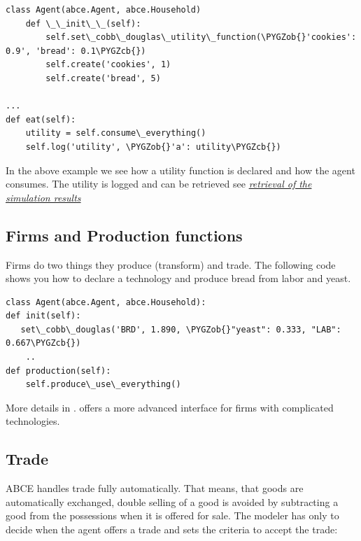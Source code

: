 \documentclass[letterpaper,10pt,english]{sphinxmanual}
\def\PYGZob{\char`\{}
\def\PYGZcb{\char`\}}
\begin{document}
\begin{Verbatim}[commandchars=\\\{\}]
class Agent(abce.Agent, abce.Household)
    def \_\_init\_\_(self):
        self.set\_cobb\_douglas\_utility\_function(\PYGZob{}'cookies': 0.9', 'bread': 0.1\PYGZcb{})
        self.create('cookies', 1)
        self.create('bread', 5)

...
def eat(self):
    utility = self.consume\_everything()
    self.log('utility', \PYGZob{}'a': utility\PYGZcb{})
\end{Verbatim}

In the above example we see how a utility function is declared and how the
agent consumes. The utility is logged and can be retrieved see
{\hyperref[simulation_results:rsr]{\emph{retrieval of the simulation results}}}


\subsection{Firms and Production functions}
\label{Walk_through:firms-and-production-functions}
Firms do two things they produce (transform) and trade. The following
code shows you how to declare a technology and produce bread from labor and
yeast.

\begin{Verbatim}[commandchars=\\\{\}]
class Agent(abce.Agent, abce.Household):
def init(self):
   set\_cobb\_douglas('BRD', 1.890, \PYGZob{}"yeast": 0.333, "LAB": 0.667\PYGZcb{})
    ..
def production(self):
    self.produce\_use\_everything()
\end{Verbatim}

More details in {\hyperref[Firm:abce.Firm]{}}. {\hyperref[FirmMultiTechnologies:abce.FirmMultiTechnologies]{}} offers
a more advanced interface for firms with complicated technologies.


\subsection{Trade}
\label{Walk_through:trade}
ABCE handles trade fully automatically. That means, that goods are automatically
exchanged, double selling of a good is avoided by subtracting a good from
the possessions when it is offered
for sale. The modeler has only to decide when the agent offers a
trade and sets the criteria to accept the trade:
\end{document}
